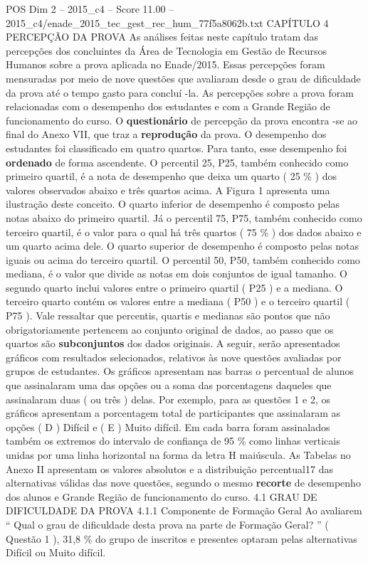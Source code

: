 \begin{textsample}{POS Dim 2 – 2015\_c4 – Score 11.00 – 2015\_c4/enade\_2015\_tec\_gest\_rec\_hum\_77f5a8062b.txt}  \label{ex:f2_pos_084}
CAPÍTULO 4 PERCEPÇÃO DA PROVA As análises feitas neste capítulo tratam das percepções dos concluintes da Área de Tecnologia em Gestão de Recursos Humanos sobre a prova aplicada no Enade/2015.
Essas percepções foram mensuradas por meio de nove questões que avaliaram desde o grau de dificuldade da prova até o tempo gasto para concluí -la.
As percepções sobre a prova foram relacionadas com o desempenho dos estudantes e com a Grande Região de funcionamento do curso.
O \textbf{questionário} de percepção da prova encontra -se ao final do Anexo VII, que traz a \textbf{reprodução} da prova.
O desempenho dos estudantes foi classificado em quatro quartos.
Para tanto, esse desempenho foi \textbf{ordenado} de forma ascendente.
O percentil 25, P25, também conhecido como primeiro quartil, é a nota de desempenho que deixa um quarto ( 25 \% ) dos valores observados abaixo e três quartos acima.
A Figura 1 apresenta uma ilustração deste conceito.
O quarto inferior de desempenho é composto pelas notas abaixo do primeiro quartil.
Já o percentil 75, P75, também conhecido como terceiro quartil, é o valor para o qual há três quartos ( 75 \% ) dos dados abaixo e um quarto acima dele.
O quarto superior de desempenho é composto pelas notas iguais ou acima do terceiro quartil.
O percentil 50, P50, também conhecido como mediana, é o valor que divide as notas em dois conjuntos de igual tamanho.
O segundo quarto inclui valores entre o primeiro quartil ( P25 ) e a mediana.
O terceiro quarto contém os valores entre a mediana ( P50 ) e o terceiro quartil ( P75 ).
Vale ressaltar que percentis, quartis e medianas são pontos que não obrigatoriamente pertencem ao conjunto original de dados, ao passo que os quartos são \textbf{subconjuntos} dos dados originais.
A seguir, serão apresentados gráficos com resultados selecionados, relativos às nove questões avaliadas por grupos de estudantes.
Os gráficos apresentam nas barras o percentual de alunos que assinalaram uma das opções ou a soma das porcentagens daqueles que assinalaram duas ( ou três ) delas.
Por exemplo, para as questões 1 e 2, os gráficos apresentam a porcentagem total de participantes que assinalaram as opções ( D ) Difícil e ( E ) Muito difícil.
Em cada barra foram assinalados também os extremos do intervalo de confiança de 95 \% como linhas verticais unidas por uma linha horizontal na forma da letra H maiúscula.
As Tabelas no Anexo II apresentam os valores absolutos e a distribuição percentual17 das alternativas válidas das nove questões, segundo o mesmo \textbf{recorte} de desempenho dos alunos e Grande Região de funcionamento do curso. 4.1 GRAU DE DIFICULDADE DA PROVA 4.1.1 Componente de Formação Geral Ao avaliarem “ Qual o grau de dificuldade desta prova na parte de Formação Geral? ” ( Questão 1 ), 31,8 \% do grupo de inscritos e presentes optaram pelas alternativas Difícil ou Muito difícil.

\end{textsample}
